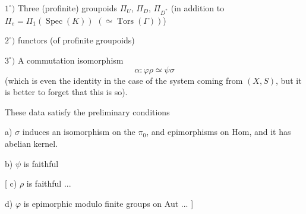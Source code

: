 

$1^\circ)$ Three (profinite) groupoids $\Pi_U$, $\Pi_D$, $\Pi_{D^*}$
(in addition to $\Pi_e=\Pi_1(\operatorname{Spec}(K))$
$(\simeq\operatorname{Tors}(\Gamma))$)

$2^\circ)$   functors
(of profinite groupoids)

$3^\circ)$ A commutation isomorphism
\[
\alpha:\varphi\rho\simeq\psi\sigma
\]
(which is even the identity in the case of the system coming from $(X,S)$,
but  it is better to forget that this is so).

These data satisfy the 
preliminary conditions

a) $\sigma$ induces an isomorphism on the $\pi_0$, and epimorphisms on Hom,
and it has abelian kernel.

b) $\psi$ is faithful

[ c) $\rho$ is faithful ...

d) $\varphi$ is epimorphic modulo finite groups on Aut ... ]

